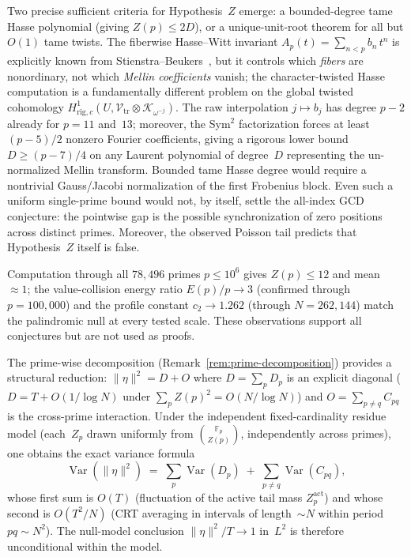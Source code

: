 \documentclass[11pt]{article}
\theoremstyle{definition}
\theoremstyle{remark}
\begin{document}
Two precise sufficient criteria for
Hypothesis~$Z$ emerge:
a bounded-degree tame Hasse polynomial
(giving $Z(p) \le 2D$),
or a unique-unit-root theorem for
all but $O(1)$ tame twists.
The fiberwise Hasse--Witt invariant
$A_p(t) = \sum_{n < p} b_n\,t^n$
is explicitly known from
Stienstra--Beukers~\cite{SB1985},
but it controls which \emph{fibers}
are nonordinary, not which
\emph{Mellin coefficients} vanish;
the character-twisted Hasse computation
is a fundamentally different problem
on the global twisted cohomology
$H^1_{\mathrm{rig},c}(U,
\mathcal{V}_{\mathrm{tr}}
\otimes \mathcal{K}_{\omega^{-j}})$.
The raw interpolation $j \mapsto b_j$
has degree $p - 2$ already for
$p = 11$ and~$13$; moreover, the
Sym$^2$ factorization forces
at least $(p{-}5)/2$ nonzero Fourier
coefficients, giving a rigorous
lower bound $D \ge (p{-}7)/4$
on any Laurent polynomial of
degree~$D$ representing the
un-normalized Mellin transform.
Bounded tame Hasse degree would
require a nontrivial Gauss/Jacobi
normalization of the first
Frobenius block.
Even such a uniform single-prime bound would not, by itself,
settle the all-index GCD conjecture: the pointwise gap is the
possible synchronization of zero positions across distinct primes.
Moreover, the observed Poisson tail predicts that
Hypothesis~$Z$ itself is false.

Computation through all $78{,}496$ primes
$p \le 10^6$ gives $Z(p) \le 12$ and
mean~$\approx 1$;
the value-collision energy ratio
$E(p)/p \to 3$ (confirmed through $p = 100{,}000$)
and the profile constant
$c_2 \to 1.262$ (through $N = 262{,}144$)
match the palindromic
null at every tested scale.
These observations support all
conjectures but are not used as proofs.

The prime-wise decomposition
(Remark~\ref{rem:prime-decomposition})
provides a structural reduction:
$\|\eta\|^2 = D + O$ where
$D = \sum_p D_p$ is an explicit diagonal
($D=T+O(1/\log N)$ under
$\sum_pZ(p)^2=O(N/\log N)$) and
$O = \sum_{p \ne q} C_{pq}$
is the cross-prime interaction.
Under the independent
fixed-cardinality residue model
(each~$Z_p$ drawn uniformly
from $\binom{\mathbb{F}_p}{Z(p)}$,
independently across primes),
one obtains the exact
variance formula
\[
\operatorname{Var}(\|\eta\|^2)
\;=\;
\sum_p \operatorname{Var}(D_p)
\;+\;
\sum_{p \ne q}
\operatorname{Var}(C_{pq}),
\]
whose first sum is $O(T)$
(fluctuation of the active tail mass
$Z_p^{\mathrm{act}}$)
and whose second is
$O(T^2/N)$ (CRT averaging
in intervals of length~$\sim N$
within period~$pq \sim N^2$).
The null-model conclusion
$\|\eta\|^2/T \to 1$ in~$L^2$
is therefore unconditional
within the model.
\end{document}

